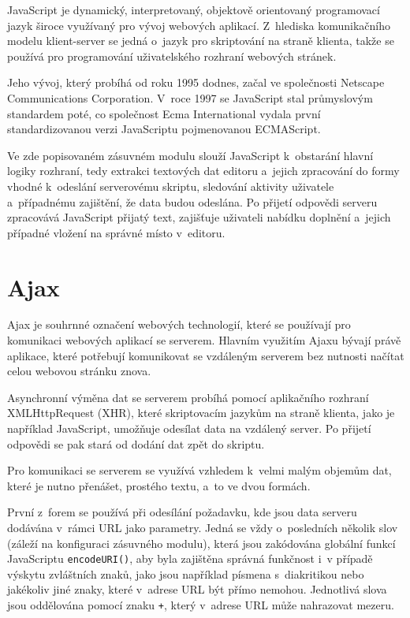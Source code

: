 \documentclass[a4paper,11pt,openany]{book} %
\begin{document}
JavaScript je dynamický, interpretovaný, objektově orientovaný programovací jazyk široce využívaný pro vývoj webových aplikací. Z~hlediska komunikačního modelu klient-server se jedná o~jazyk pro skriptování na straně klienta, takže se používá pro programování uživatelského rozhraní webových stránek. \parencite[2--4]{flanagan2006javascript} %


Jeho vývoj, který probíhá od roku 1995 dodnes, začal ve společnosti Netscape Communications Corporation. V~roce 1997 se JavaScript stal průmyslovým standardem poté, co společnost Ecma International vydala první standardizovanou verzi JavaScriptu pojmenovanou ECMAScript. \parencite{brendaneich2011} %

Ve zde popisovaném zásuvném modulu slouží JavaScript k~obstarání hlavní logiky rozhraní, tedy extrakci textových dat editoru a~jejich zpracování do formy vhodné k~odeslání serverovému skriptu, sledování aktivity uživatele a~případnému zajištění, že data budou odeslána. Po přijetí odpovědi serveru zpracovává JavaScript přijatý text, zajišťuje uživateli nabídku doplnění a~jejich případné vložení na správné místo v~editoru. 

\section{Ajax}

Ajax je souhrnné označení webových technologií, které se používají pro komunikaci webových aplikací se serverem. Hlavním využitím Ajaxu bývají právě aplikace, které potřebují komunikovat se vzdáleným serverem bez nutnosti načítat celou webovou stránku znova. \parencite{garrett2005ajax}

Asynchronní výměna dat se serverem probíhá pomocí aplikačního rozhraní XMLHttpRequest (XHR), které skriptovacím jazykům na straně klienta, jako je například JavaScript, umožňuje odesílat data na vzdálený server. Po přijetí odpovědi se pak stará od dodání dat zpět do skriptu.

Pro komunikaci se serverem se využívá vzhledem k~velmi malým objemům dat, které je nutno přenášet, prostého textu, a~to ve dvou formách. 

První z~forem se používá při odesílání požadavku, kde jsou data serveru dodávána v~rámci URL jako parametry. Jedná se vždy o~posledních několik slov (záleží na konfiguraci zásuvného modulu), která jsou zakódována globální funkcí JavaScriptu {\tt encodeURI()}, aby byla zajištěna správná funkčnost i~v případě výskytu zvláštních znaků, jako jsou například písmena s~diakritikou nebo jakékoliv jiné znaky, které v~adrese URL být přímo nemohou. Jednotlivá slova jsou oddělována pomocí znaku {\tt +}, který v~adrese URL může nahrazovat mezeru.
\end{document}
